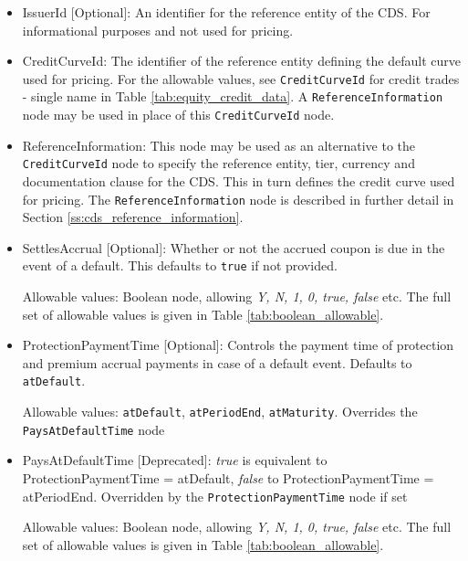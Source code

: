 \begin{itemize}
\item IssuerId [Optional]: An identifier for the reference entity of the CDS. For informational purposes and not used for pricing.
\item CreditCurveId: The identifier of the reference entity defining the default curve used for pricing. For the allowable values, see \lstinline!CreditCurveId! for credit trades - single name in Table \ref{tab:equity_credit_data}. A \lstinline!ReferenceInformation! node may be used in place of this \lstinline!CreditCurveId! node.
\item ReferenceInformation: This node may be used as an alternative to the \lstinline!CreditCurveId! node to specify the reference entity, tier, currency and documentation clause for the CDS. This in turn defines the credit curve used for pricing. The \lstinline!ReferenceInformation! node is described in further detail in Section \ref{ss:cds_reference_information}.
\item SettlesAccrual [Optional]: Whether or not the accrued coupon is due in the event of a default. This defaults to \lstinline!true! if not provided.

Allowable values: Boolean node, allowing \emph{Y, N, 1, 0, true, false} etc. The full set of allowable values is given in Table \ref{tab:boolean_allowable}.

\item ProtectionPaymentTime [Optional]: Controls the payment time of protection and premium accrual payments in case of
  a default event. Defaults to \lstinline!atDefault!. 
  
Allowable values: \lstinline!atDefault!, \lstinline!atPeriodEnd!, \lstinline!atMaturity!. Overrides the \lstinline!PaysAtDefaultTime! node
  
\item PaysAtDefaultTime [Deprecated]: \emph{true} is equivalent to ProtectionPaymentTime = atDefault,
  \emph{false} to ProtectionPaymentTime = atPeriodEnd. Overridden by the \lstinline!ProtectionPaymentTime! node if set
  
Allowable values: Boolean node, allowing \emph{Y, N, 1, 0, true, false} etc. The full set of allowable values is given in Table \ref{tab:boolean_allowable}.
  

\end{itemize}
